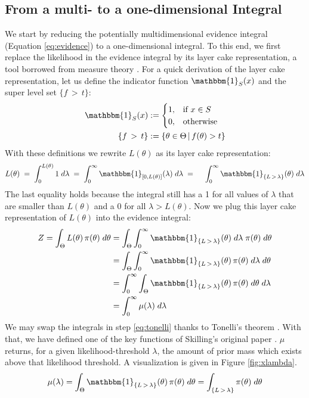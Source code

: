 \documentclass[12pt, a4paper]{report}
\begin{document}
\subsection{From a multi- to a one-dimensional Integral}
We start by reducing the potentially multidimensional evidence integral (Equation \ref{eq:evidence}) to a one-dimensional integral.
To this end, we first replace the likelihood in the evidence integral by its layer cake representation, a tool borrowed from measure theory \cite[26]{liebloss}.
For a quick derivation of the layer cake representation, let us define the indicator function $\mathbbm{1}_S(x)$  and the super level set $\{f \, > \, t\}$:
\begin{align*}
    \mathbbm{1}_S(x) &:= \begin{cases}
        1, & \textrm{if } x \in S \\
        0, & \textrm{otherwise}
    \end{cases} \\
    \{f \, > \, t\} &:= \{ \theta \in \Theta \, | \, f(\theta) > t \}
\end{align*}
With these definitions we rewrite $L(\theta)$ as its layer cake representation:
\begin{align*}
    L(\theta) 
    \; = \; \int_0^{L(\theta)} 1 \; d\lambda
    \; = \; \int_0^{\infty} \mathbbm{1}_{[0,L(\theta)]}(\lambda) \; d\lambda
    \; = \; \quad \int_0^{\infty} \mathbbm{1}_{\{ L \, > \, \lambda \}}(\theta) \; d\lambda 
\end{align*}
The last equality holds because the integral still has a 1 for all values of $\lambda$ that are smaller than $L(\theta)$ and a 0 for all $\lambda > L(\theta)$.
Now we plug this layer cake representation of $L(\theta)$ into the evidence integral:
\begin{align}
    Z = \int_\Theta L(\theta) \, \pi(\theta) \; d\theta &= \int_{\Theta} \int_0^{\infty} \mathbbm{1}_{\{ L \, > \, \lambda \}}(\theta) \; d\lambda \; \pi(\theta) \; d\theta \nonumber\\
    &= \int_\Theta \int_0^{\infty} \mathbbm{1}_{\{ L \, > \, \lambda \}}(\theta) \, \pi(\theta) \; d\lambda \; d\theta \nonumber\\
    &= \int_0^{\infty} \int_\Theta \mathbbm{1}_{\{ L \, > \, \lambda \}}(\theta) \, \pi(\theta) \; d\theta \; d\lambda \label{eq:tonelli}\\
    &= \int_0^{\infty} \mu(\lambda) \; d\lambda
    \label{eq:integral_2}
\end{align}
We may swap the integrals in step \ref{eq:tonelli} thanks to Tonelli's theorem \cite[147]{measure_theory}.
With that, we have defined one of the key functions of Skilling's original paper \cite{skilling}. $\mu$ returns, for a given likelihood-threshold $\lambda$, the amount of prior mass which exists above that likelihood threshold. A visualization is given in Figure \ref{fig:xlambda}.
$$
\mu(\lambda) 
= \int_\Theta \mathbbm{1}_{\{ L \, > \, \lambda \}}(\theta) \, \pi(\theta) \; d\theta 
= \int_{\{L \,>\, \lambda\}} \pi(\theta) \; d\theta
$$
\end{document}
